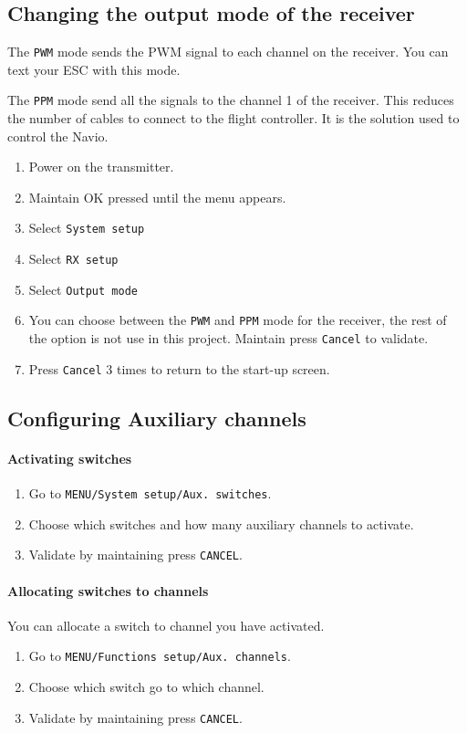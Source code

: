 \subsection{Changing the output mode of the receiver}
The \texttt{PWM} mode sends the PWM signal to each channel on the receiver. You can text your ESC with this mode.

The \texttt{PPM} mode send all the signals to the channel 1 of the receiver. This reduces the number of cables to connect to the flight controller. It is the solution used to control the Navio.

\begin{enumerate}
    \item Power on the transmitter.
    \item Maintain OK pressed until the menu appears.
    \item Select \texttt{System setup}
    \item Select \texttt{RX setup}
    \item Select \texttt{Output mode}
    \item You can choose between the \texttt{PWM} and \texttt{PPM} mode for the receiver, the rest of the option is not use in this project. Maintain press \texttt{Cancel} to validate.
    \item Press \texttt{Cancel} 3 times to return to the start-up screen.
\end{enumerate}

\subsection{Configuring Auxiliary channels}
\paragraph{Activating switches}
\begin{enumerate}
    \item Go to \texttt{MENU/System setup/Aux. switches}.
    \item Choose which switches and how many auxiliary channels to activate.
    \item Validate by maintaining press \texttt{CANCEL}.
\end{enumerate}

\paragraph{Allocating switches to channels}
You can allocate a switch to channel you have activated.
\begin{enumerate}
    \item Go to \texttt{MENU/Functions setup/Aux. channels}.
    \item Choose which switch go to which channel.
    \item Validate by maintaining press \texttt{CANCEL}.
\end{enumerate}

